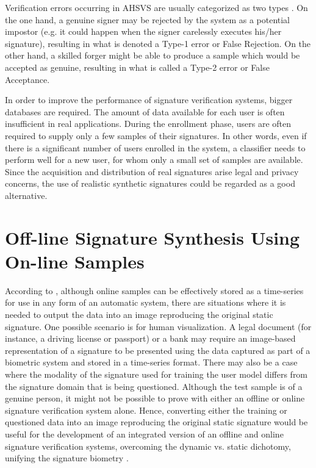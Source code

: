 Verification errors occurring in AHSVS are usually categorized as two types \cite{fairhurst1997signature}. On the one hand, a genuine signer may be rejected by the system as a potential impostor (e.g. it could happen when the signer carelessly executes his/her signature), resulting in what is denoted a Type-1 error or False
Rejection. On the other hand, a skilled forger might be able to produce a sample which would be accepted as genuine, resulting in what is called a Type-2 error or False Acceptance. 

In order to improve the performance of signature verification
systems, bigger databases are required. The amount of data available for each user is often
insufficient in real applications. During the enrollment phase,
users are often required to supply only a few samples of their
signatures. In other words, even if there is a significant number
of users enrolled in the system, a classifier needs to perform
well for a new user, for whom only a small set of samples are
available. Since the acquisition
and distribution of real signatures arise legal and privacy
concerns, the use of realistic synthetic signatures could be
regarded as a good alternative. 

\section{Off-line Signature Synthesis Using On-line Samples}

According to \cite{guest2013assessment}, although online samples can be effectively stored as a time-series for use in any form of an automatic system, there are situations where it is needed to output the data into an image reproducing the original static signature. One possible scenario is for human visualization. A legal document (for instance, a driving license or passport) or a bank may require an image-based representation of a signature to
be presented using the data captured as part of a biometric system and stored in a time-series format. There may also be a case where the modality of the signature used for training the user model differs from the signature domain that is being questioned. Although the test sample is of a genuine person, it might not be possible to prove with either an offline or online signature verification system alone. Hence, converting either the training or questioned data into an image reproducing the original static signature would be useful for the development of an integrated version of an offline and online signature verification systems, overcoming the dynamic vs. static dichotomy, unifying the signature biometry \cite{chapter}.

